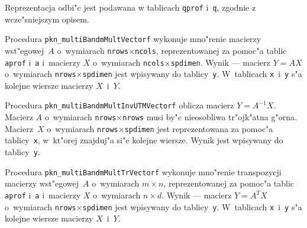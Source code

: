 Reprezentacja odbi"c jest podawana w tablicach \texttt{qprof} i~\texttt{q},
zgodnie z wcze"sniejszym opisem.

\vspace{\bigskipamount}
Procedura \texttt{pkn\_multiBandmMultVectorf} wykonuje mno"renie macierzy
wst"egowej~$A$ o~wymiarach \texttt{nrows}$\times$\texttt{ncols},
reprezentowanej za pomoc"a tablic \texttt{aprof} i~\texttt{a} i~macierzy $X$
o~wymiarach \texttt{ncols}$\times$\texttt{spdimen}. Wynik --- macierz $Y=AX$
o~wymiarach \texttt{nrows}$\times$\texttt{spdimen} jest wpisywany do
tablicy~\texttt{y}. W~tablicach \texttt{x}~i~\texttt{y} s"a kolejne wiersze
macierzy $X$~i~$Y$.

\vspace{\bigskipamount}
Procedura \texttt{pkn\_multiBandmMultInvUTMVectorf} oblicza macierz $Y=A^{-1}X$.
Macierz $A$ o~wymiarach \texttt{nrows}$\times$\texttt{nrows}
musi by"c nieosobliwa tr"ojk"atna g"orna. Macierz~$X$ o~wymiarach
\texttt{nrows}$\times$\texttt{spdimen} jest reprezentowana za pomoc"a
tablicy~\texttt{x}, w~kt"orej znajduj"a si"e kolejne wiersze. Wynik jest
wpisywany do tablicy~\texttt{y}.

\vspace{\bigskipamount}
\begin{sloppypar}
Procedura \texttt{pkn\_multiBandmMultTrVectorf} wykonuje mno"renie
transpozycji macierzy wst"egowej~$A$ o~wymiarach
$m\times n$, reprezentowanej za pomoc"a tab\-lic \texttt{aprof} i~\texttt{a}
i~macierzy $X$ o~wymiarach $n\times d$. Wynik --- macierz $Y=A^TX$
o~wymiarach \texttt{nrows}$\times$\texttt{spdimen} jest wpisywany do
tablicy~\texttt{y}. W~tablicach \texttt{x}~i~\texttt{y} s"a kolejne wiersze
macierzy $X$~i~$Y$.%
\end{sloppypar}

